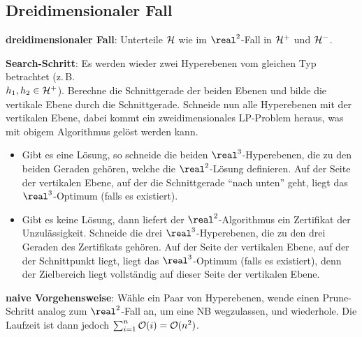 \pagebreak

\subsection{%
    Dreidimensionaler Fall%
}

\textbf{dreidimensionaler Fall}:
Unterteile $\mathcal{H}$ wie im $\real^2$-Fall in $\mathcal{H}^+$ und $\mathcal{H}^-$.

\textbf{Search-Schritt}:
Es werden wieder zwei Hyperebenen vom gleichen Typ betrachtet (z.\,B.\\
$h_1, h_2 \in \mathcal{H}^+$).
Berechne die Schnittgerade der beiden Ebenen und bilde die vertikale Ebene durch die Schnittgerade.
Schneide nun alle Hyperebenen mit der vertikalen Ebene,
dabei kommt ein zweidimensionales LP-Problem heraus, was mit obigem Algorithmus gelöst werden kann.
\begin{itemize}
    \item
    Gibt es eine Lösung, so schneide die beiden $\real^3$-Hyperebenen, die zu den beiden Geraden
    gehören, welche die $\real^2$-Lösung definieren.
    Auf der Seite der vertikalen Ebene, auf der die Schnittgerade "`nach unten"' geht,
    liegt das $\real^3$-Optimum (falls es existiert).

    \item
    Gibt es keine Lösung, dann liefert der $\real^2$-Algorithmus ein Zertifikat der Unzulässigkeit.
    Schneide die drei $\real^3$-Hyperebenen, die zu den drei Geraden des Zertifikats gehören.
    Auf der Seite der vertikalen Ebene, auf der der Schnittpunkt liegt, liegt das $\real^3$-Optimum
    (falls es existiert), denn der Zielbereich liegt vollständig auf dieser Seite der vertikalen
    Ebene.
\end{itemize}

\linie

\textbf{naive Vorgehensweise}:
Wähle ein Paar von Hyperebenen, wende einen Prune-Schritt analog zum $\real^2$-Fall an,
um eine NB wegzulassen, und wiederhole.
Die Laufzeit ist dann jedoch $\sum_{i=1}^n \mathcal{O}(i) = \mathcal{O}(n^2)$.

